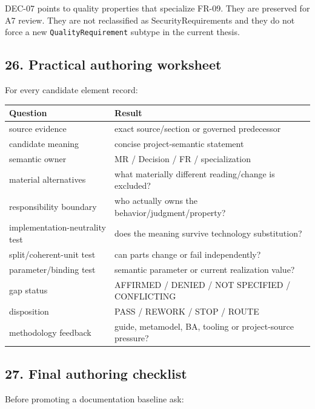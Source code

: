 \documentclass[11pt,a4paper]{article}
\begin{document}
DEC-07 points to quality properties that specialize FR-09. They are
preserved for A7 review. They are not reclassified as
SecurityRequirements and they do not force a new
\texttt{QualityRequirement} subtype in the current thesis.

\subsection{26. Practical authoring
worksheet}\label{26-practical-authoring-worksheet}

For every candidate element record:

\begin{longtable}[]{@{}ll@{}}
\toprule\noalign{}
Question & Result \\
\midrule\noalign{}
\endhead
\bottomrule\noalign{}
\endlastfoot
source evidence & exact source/section or governed predecessor \\
candidate meaning & concise project-semantic statement \\
semantic owner & MR / Decision / FR / specialization \\
material alternatives & what materially different reading/change is
excluded? \\
responsibility boundary & who actually owns the
behavior/judgment/property? \\
implementation-neutrality test & does the meaning survive technology
substitution? \\
split/coherent-unit test & can parts change or fail independently? \\
parameter/binding test & semantic parameter or current realization
value? \\
gap status & AFFIRMED / DENIED / NOT SPECIFIED / CONFLICTING \\
disposition & PASS / REWORK / STOP / ROUTE \\
methodology feedback & guide, metamodel, BA, tooling or project-source
pressure? \\
\end{longtable}

\subsection{27. Final authoring
checklist}\label{27-final-authoring-checklist}

Before promoting a documentation baseline ask:
\end{document}
